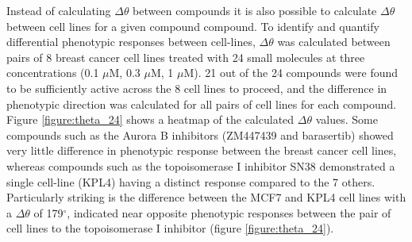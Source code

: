 \documentclass[a4paper,11pt,twoside,openright]{scrbook}
\begin{document}
Instead of calculating $\Delta\theta$ between compounds it is also possible to calculate $\Delta\theta$ between cell lines for a given compound compound.
To identify and quantify differential phenotypic responses between cell-lines, $\Delta\theta$ was calculated between pairs of 8 breast cancer cell lines treated with 24 small molecules at three concentrations (0.1 $\mu$M, 0.3 $\mu$M, 1 $\mu$M).
21 out of the 24 compounds were found to be sufficiently active across the 8 cell lines to proceed, and the difference in phenotypic direction was calculated for all pairs of cell lines for each compound.
Figure \ref{figure:theta_24} shows a heatmap of the calculated $\Delta\theta$ values.
Some compounds such as the Aurora B inhibitors (ZM447439 and barasertib) showed very little difference in phenotypic response between the breast cancer cell lines, whereas compounds such as the topoisomerase I inhibitor SN38 demonstrated a single cell-line (KPL4) having a distinct response compared to the 7 others.
Particularly striking is the difference between the MCF7 and KPL4 cell lines with a $\Delta\theta$ of 179$^\circ$, indicated near opposite phenotypic responses between the pair of cell lines to the topoisomerase I inhibitor (figure \ref{figure:theta_24}).
\end{document}
